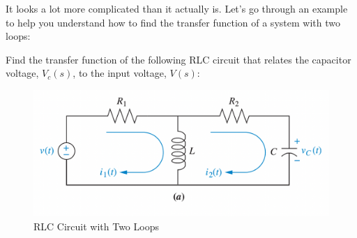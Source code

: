 \documentclass{article}
\theoremstyle{mytheoremstyle}
\theoremstyle{mytheoremstyle}
\theoremstyle{myproblemstyle}
\theoremstyle{break}
\begin{document}
It looks a lot more complicated than it actually is. Let's go through an example to help you understand how to find the transfer function of a system with two loops:

\begin{problem}
Find the transfer function of the following RLC circuit that relates the capacitor voltage, $V_c(s)$, to the input voltage, $V(s)$:
\begin{figure}[H]
	\includegraphics[scale=0.1]{RLC Circuit with Two Loops}
	\centering
	\caption{RLC Circuit with Two Loops}
\end{figure}
\end{problem}

\end{document}
